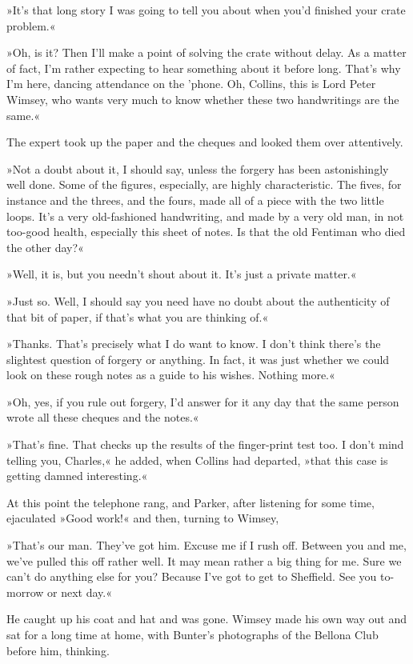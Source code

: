 »It's that long story I was going to tell you about when you'd finished your crate problem.«

»Oh, is it? Then I'll make a point of solving the crate without delay. As a matter of fact, I'm rather expecting to hear something about it before long. That's why I'm here, dancing attendance on the 'phone. Oh, Collins, this is Lord Peter Wimsey, who wants very much to know whether these two handwritings are the same.«

The expert took up the paper and the cheques and looked them over attentively.

»Not a doubt about it, I should say, unless the forgery has been astonishingly well done. Some of the figures, especially, are highly characteristic. The fives, for instance and the threes, and the fours, made all of a piece with the two little loops. It's a very old-fashioned handwriting, and made by a very old man, in not too-good health, especially this sheet of notes. Is that the old Fentiman who died the other day?«

»Well, it is, but you needn't shout about it. It's just a private matter.«

»Just so. Well, I should say you need have no doubt about the authenticity of that bit of paper, if that's what you are thinking of.«

»Thanks. That's precisely what I do want to know. I don't think there's the slightest question of forgery or anything. In fact, it was just whether we could look on these rough notes as a guide to his wishes. Nothing more.«

»Oh, yes, if you rule out forgery, I'd answer for it any day that the same person wrote all these cheques and the notes.«

»That's fine. That checks up the results of the finger-print test too. I don't mind telling you, Charles,« he added, when Collins had departed, »that this case is getting damned interesting.«

At this point the telephone rang, and Parker, after listening for some time, ejaculated »Good work!« and then, turning to Wimsey,

»That's our man. They've got him. Excuse me if I rush off. Between you and me, we've pulled this off rather well. It may mean rather a big thing for me. Sure we can't do anything else for you? Because I've got to get to Sheffield. See you to-morrow or next day.«

He caught up his coat and hat and was gone. Wimsey made his own way out and sat for a long time at home, with Bunter's photographs of the Bellona Club before him, thinking.


